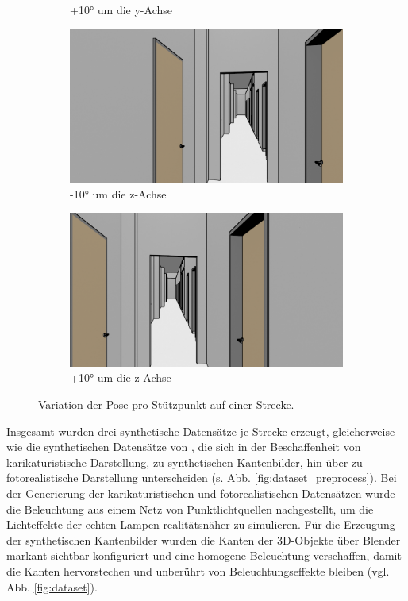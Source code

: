 \begin{figure}
\begin{subfigure}[t]{0.18\linewidth}
		\caption{+10° um die y-Achse}
		\label{subfig:iz0_y+10}
	\end{subfigure}
	\hfill
	\begin{subfigure}[t]{0.18\linewidth}
		\centering
		\includegraphics[width=\linewidth]{images/syn_dataset/00024.png}
		\caption{-10° um die z-Achse}
		\label{subfig:iz-10_y0}
	\end{subfigure}
	\hfill
	\begin{subfigure}[t]{0.18\linewidth}
		\centering
		\includegraphics[width=\linewidth]{images/syn_dataset/00022.png}
		\caption{+10° um die z-Achse}
		\label{subfig:iz+10_y0}
	\end{subfigure}
	\caption{Variation der Pose pro Stützpunkt auf einer Strecke.}
	\label{fig:dataset_variation}
\end{figure}

Insgesamt wurden drei synthetische Datensätze je Strecke erzeugt, gleicherweise wie die synthetischen Datensätze von \citet{acharyaBIMPoseNetIndoorCamera2019}, die sich in der Beschaffenheit von karikaturistische Darstellung, zu synthetischen Kantenbilder, hin über zu fotorealistische Darstellung unterscheiden (s. Abb. \ref{fig:dataset_preprocess}). Bei der Generierung der karikaturistischen und fotorealistischen Datensätzen wurde die Beleuchtung aus einem Netz von Punktlichtquellen nachgestellt, um die Lichteffekte der echten Lampen realitätsnäher zu simulieren.
Für die Erzeugung der synthetischen Kantenbilder wurden die Kanten der 3D-Objekte über Blender markant sichtbar konfiguriert und eine homogene Beleuchtung verschaffen, damit die Kanten hervorstechen und unberührt von Beleuchtungseffekte bleiben (vgl. Abb. \ref{fig:dataset}). 

